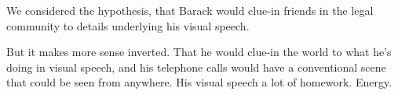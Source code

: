 

We considered the hypothesis, that Barack would clue-in friends in the
legal community to details underlying his visual speech.  

But it makes more sense inverted.  That he would clue-in the world to
what he's doing in visual speech, and his telephone calls would have a
conventional scene that could be seen from anywhere.  His visual
speech a lot of homework.  Energy.

\bye
